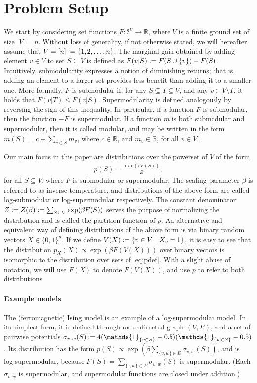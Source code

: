 \section{Problem Setup} \label{sect:setup}
We start by considering set functions $F : 2^V \to \mathbb{R}$, where $V$ is a finite ground set of size $|V| = n$.
Without loss of generality, if not otherwise stated, we will hereafter assume that $V = [n] \vcentcolon= \{1, 2, \ldots,n\}$.
The marginal gain obtained by adding element $v \in V$ to set $S \subseteq V$ is defined as $F(v|S) \vcentcolon= F(S \cup \{v\}) - F(S)$.
Intuitively, submodularity expresses a notion of diminishing returns; that is, adding an element to a larger set provides less benefit than adding it to a smaller one.
More formally, $F$ is submodular if, for any $S \subseteq T \subseteq V$, and any $v \in V \setminus T$, it holds that $F(v|T) \leq F(v|S)$.
Supermodularity is defined analogously by reversing the sign of this inequality.
In particular, if a function $F$ is submodular, then the function $-F$ is supermodular.
If a function $m$ is both submodular and supermodular, then it is called modular, and may be written in the form $m(S) = c + \sum_{v \in S} m_v$, where $c \in \mathbb{R}$, and $m_v \in \mathbb{R}$, for all $v \in V$.

Our main focus in this paper are distributions over the powerset of $V$ of the form
\begin{align}\label{eq:pdef}
p(S) = \frac{\exp(\beta F(S))}{Z},
\end{align}
for all $S \subseteq V$, where $F$ is submodular or supermodular.
The scaling parameter $\beta$ is referred to as inverse temperature, and distributions of the above form are called log-submodular or log-supermodular respectively.
The constant denominator $Z \vcentcolon= Z(\beta) \vcentcolon= \sum_{S \subseteq V} \exp(\beta F(S))$ serves the purpose of normalizing the distribution and is called the partition function of $p$.
An alternative and equivalent way of defining distributions of the above form is via binary random vectors $X \in \{0, 1\}^n$.
If we define $V(X) \vcentcolon= \left\{v \in V\ \middle\vert\  X_v = 1\right\}$, it is easy to see that the distribution $p_X(X) \propto \exp(\beta F(V(X)))$ over binary vectors is isomorphic to the distribution over sets of \eqref{eq:pdef}.
With a slight abuse of notation, we will use $F(X)$ to denote $F(V(X))$, and use $p$ to refer to both distributions.

\paragraph{Example models}
The (ferromagnetic) Ising model is an example of a log-supermodular model.
In its simplest form, it is defined through an undirected graph $(V, E)$, and a set of pairwise potentials $\sigma_{v,w}(S) \defeq 4(\mathds{1}_{\{v \in S\}}-0.5)(\mathds{1}_{\{w \in S\}}-0.5)$.
Its distribution has the form $p(S) \propto \exp(\beta\sum_{\{v,w\} \in E} \sigma_{v,w}(S))$, and is log-supermodular, because $F(S) = \sum_{\{v,w\} \in E} \sigma_{v,w}(S)$ is supermodular. (Each $\sigma_{v,w}$ is supermodular, and supermodular functions are closed under addition.)

